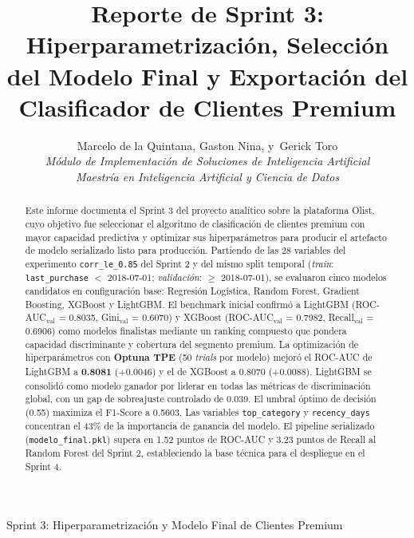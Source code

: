 \documentclass[journal,letterpaper]{IEEEtran}
\begin{document}
\title{Reporte de Sprint 3: Hiperparametrización, Selección del Modelo Final y Exportación del Clasificador de Clientes Premium}

\author{Marcelo de la Quintana,
        Gaston Nina,
        y~Gerick Toro\\
        \textit{Módulo de Implementación de Soluciones de Inteligencia Artificial}\\
        \textit{Maestría en Inteligencia Artificial y Ciencia de Datos}}

%
{Sprint 3: Hiperparametrización y Modelo Final de Clientes Premium}

\maketitle

\begin{abstract}
Este informe documenta el Sprint 3 del proyecto analítico sobre la plataforma Olist, cuyo objetivo fue seleccionar el algoritmo de clasificación de clientes premium con mayor capacidad predictiva y optimizar sus hiperparámetros para producir el artefacto de modelo serializado listo para producción. Partiendo de las 28 variables del experimento \texttt{corr\_le\_0.85} del Sprint 2 y del mismo split temporal (\textit{train}: \texttt{last\_purchase} $<$ 2018-07-01; \textit{validación}: $\geq$ 2018-07-01), se evaluaron cinco modelos candidatos en configuración base: Regresión Logística, Random Forest, Gradient Boosting, XGBoost y LightGBM. El benchmark inicial confirmó a LightGBM (ROC-AUC$_{\text{val}}$ = 0.8035, Gini$_{\text{val}}$ = 0.6070) y XGBoost (ROC-AUC$_{\text{val}}$ = 0.7982, Recall$_{\text{val}}$ = 0.6906) como modelos finalistas mediante un ranking compuesto que pondera capacidad discriminante y cobertura del segmento premium. La optimización de hiperparámetros con \textbf{Optuna TPE} (50 \textit{trials} por modelo) mejoró el ROC-AUC de LightGBM a \textbf{0.8081} (+0.0046) y el de XGBoost a 0.8070 (+0.0088). LightGBM se consolidó como modelo ganador por liderar en todas las métricas de discriminación global, con un gap de sobreajuste controlado de 0.039. El umbral óptimo de decisión (0.55) maximiza el F1-Score a 0.5603. Las variables \texttt{top\_category} y \texttt{recency\_days} concentran el 43\% de la importancia de ganancia del modelo. El pipeline serializado (\texttt{modelo\_final.pkl}) supera en 1.52 puntos de ROC-AUC y 3.23 puntos de Recall al Random Forest del Sprint 2, estableciendo la base técnica para el despliegue en el Sprint 4.
\end{abstract}
\end{document}
